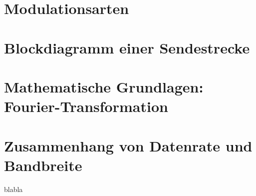 \section{Modulationsarten}
\section{Blockdiagramm einer Sendestrecke}
\section{Mathematische Grundlagen: Fourier-Transformation}
\section{Zusammenhang von Datenrate und Bandbreite}
blabla
\clearpage